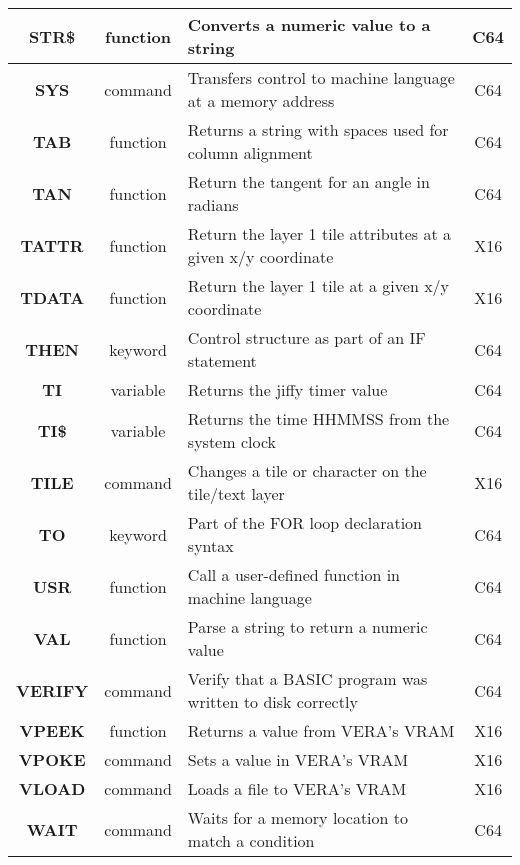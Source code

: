 \begin{longtable}{|c|c|m{4cm}|c|}
	{\bfseries STR\$} & function & Converts a numeric value to a string & C64 \\ \hline
	{\bfseries SYS} & command & Transfers control to machine language at a memory address & C64 \\ \hline
	{\bfseries TAB} & function & Returns a string with spaces used for column alignment & C64 \\ \hline
	{\bfseries TAN} & function & Return the tangent for an angle in radians & C64 \\ \hline
	{\bfseries TATTR} & function & Return the layer 1 tile attributes at a given x/y coordinate & X16 \\ \hline
	{\bfseries TDATA} & function & Return the layer 1 tile at a given x/y coordinate & X16 \\ \hline
	{\bfseries THEN} & keyword & Control structure as part of an {\ttfamily IF} statement & C64 \\ \hline
	{\bfseries TI} & variable & Returns the jiffy timer value & C64 \\ \hline
	{\bfseries TI\$} & variable & Returns the time HHMMSS from the system clock & C64 \\ \hline
	{\bfseries TILE} & command & Changes a tile or character on the tile/text layer & X16 \\ \hline
	{\bfseries TO} & keyword & Part of the {\ttfamily FOR} loop declaration syntax & C64 \\ \hline
	{\bfseries USR} & function & Call a user-defined function in machine language & C64 \\ \hline
	{\bfseries VAL} & function & Parse a string to return a numeric value & C64 \\ \hline
	{\bfseries VERIFY} & command & Verify that a BASIC program was written to disk correctly & C64 \\ \hline
	{\bfseries VPEEK} & function & Returns a value from VERA's VRAM & X16 \\ \hline
	{\bfseries VPOKE} & command & Sets a value in VERA's VRAM & X16 \\ \hline
	{\bfseries VLOAD} & command & Loads a file to VERA's VRAM & X16 \\ \hline
	{\bfseries WAIT} & command & Waits for a memory location to match a condition & C64 \\ \hline
\end{longtable}

